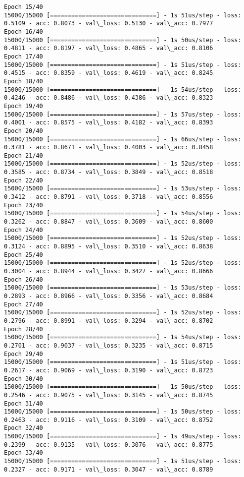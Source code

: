 \documentclass[11pt]{article}
\begin{document}
\begin{Verbatim}[commandchars=\\\{\}]
Epoch 15/40
15000/15000 [==============================] - 1s 51us/step - loss: 0.5109 - acc: 0.8073 - val\_loss: 0.5130 - val\_acc: 0.7977
Epoch 16/40
15000/15000 [==============================] - 1s 50us/step - loss: 0.4811 - acc: 0.8197 - val\_loss: 0.4865 - val\_acc: 0.8106
Epoch 17/40
15000/15000 [==============================] - 1s 51us/step - loss: 0.4515 - acc: 0.8359 - val\_loss: 0.4619 - val\_acc: 0.8245
Epoch 18/40
15000/15000 [==============================] - 1s 54us/step - loss: 0.4246 - acc: 0.8486 - val\_loss: 0.4386 - val\_acc: 0.8323
Epoch 19/40
15000/15000 [==============================] - 1s 57us/step - loss: 0.4001 - acc: 0.8575 - val\_loss: 0.4182 - val\_acc: 0.8393
Epoch 20/40
15000/15000 [==============================] - 1s 66us/step - loss: 0.3781 - acc: 0.8671 - val\_loss: 0.4003 - val\_acc: 0.8458
Epoch 21/40
15000/15000 [==============================] - 1s 52us/step - loss: 0.3585 - acc: 0.8734 - val\_loss: 0.3849 - val\_acc: 0.8518
Epoch 22/40
15000/15000 [==============================] - 1s 53us/step - loss: 0.3412 - acc: 0.8791 - val\_loss: 0.3718 - val\_acc: 0.8556
Epoch 23/40
15000/15000 [==============================] - 1s 54us/step - loss: 0.3262 - acc: 0.8847 - val\_loss: 0.3609 - val\_acc: 0.8600
Epoch 24/40
15000/15000 [==============================] - 1s 52us/step - loss: 0.3124 - acc: 0.8895 - val\_loss: 0.3510 - val\_acc: 0.8638
Epoch 25/40
15000/15000 [==============================] - 1s 52us/step - loss: 0.3004 - acc: 0.8944 - val\_loss: 0.3427 - val\_acc: 0.8666
Epoch 26/40
15000/15000 [==============================] - 1s 53us/step - loss: 0.2893 - acc: 0.8966 - val\_loss: 0.3356 - val\_acc: 0.8684
Epoch 27/40
15000/15000 [==============================] - 1s 52us/step - loss: 0.2796 - acc: 0.8991 - val\_loss: 0.3294 - val\_acc: 0.8702
Epoch 28/40
15000/15000 [==============================] - 1s 54us/step - loss: 0.2701 - acc: 0.9037 - val\_loss: 0.3235 - val\_acc: 0.8715
Epoch 29/40
15000/15000 [==============================] - 1s 51us/step - loss: 0.2617 - acc: 0.9069 - val\_loss: 0.3190 - val\_acc: 0.8723
Epoch 30/40
15000/15000 [==============================] - 1s 50us/step - loss: 0.2546 - acc: 0.9075 - val\_loss: 0.3145 - val\_acc: 0.8745
Epoch 31/40
15000/15000 [==============================] - 1s 50us/step - loss: 0.2463 - acc: 0.9116 - val\_loss: 0.3109 - val\_acc: 0.8752
Epoch 32/40
15000/15000 [==============================] - 1s 49us/step - loss: 0.2399 - acc: 0.9135 - val\_loss: 0.3076 - val\_acc: 0.8775
Epoch 33/40
15000/15000 [==============================] - 1s 51us/step - loss: 0.2327 - acc: 0.9171 - val\_loss: 0.3047 - val\_acc: 0.8789

\end{Verbatim}
\end{document}
